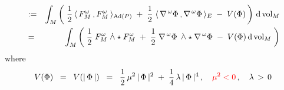 \begin{itemize}
\begin{eqnarray*}
	& := &
		\int_{M}\left(\;
			\dfrac{1}{2}\,\langle\,F^{\omega}_{M} \,, F^{\omega}_{M}\,\rangle_{\textnormal{Ad}(P)}
			\;+\;
			\dfrac{1}{2}\;\langle\,\nabla^{\,\omega}\Phi \,, \nabla^{\,\omega}\Phi\,\rangle_{E}
			\;-\;
			V(\Phi)
			\,\right)
			\,\textnormal{d}\,\textnormal{vol}_{M} 
	\\
	& = &
		\int_{M}\left(\;
			\dfrac{1}{2}\; F^{\omega}_{M} \;\dot{\wedge}\star F^{\omega}_{M}
			\;+\;
			\dfrac{1}{2}\;\nabla^{\,\omega}\Phi\;\dot{\,\wedge} \star\nabla^{\,\omega}\Phi
			\;-\;
			V(\Phi)\,\textnormal{d}\,\textnormal{vol}_{M} 
			\;\right)
	\end{eqnarray*}
	where
	\begin{equation*}
	V(\Phi) \;\; = \;\; V(\vert\,\Phi\,\vert)
	\;\; = \;\;
		\dfrac{1}{2}\,\mu^{2}\,\vert\,\Phi\,\vert^{2}
		\;+\;
		\dfrac{1}{4}\,\lambda\,\vert\,\Phi\,\vert^{4}\,,
	\quad
	{\color{red}\mu^{2} < 0}\,,
	\quad
	\lambda \, > \, 0
	\end{equation*}
\end{itemize}


\begin{theorem}
\mbox{}
\vskip 0.2cm
\noindent
\end{theorem}



